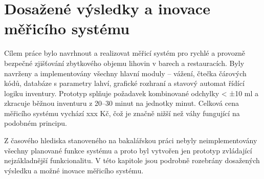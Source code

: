 



%
%

\chapter{Dosažené výsledky a inovace měřicího systému}

 Cílem práce bylo navrhnout a realizovat měřicí systém pro rychlé a provozně bezpečné zjišťování zbytkového objemu lihovin v barech a restauracích. Byly navrženy a implementovány všechny hlavní moduly – vážení, čtečka čárových kódů, databáze s parametry lahví, grafické rozhraní a stavový automat řídící logiku inventury.  Prototyp splňuje požadavek kombinované odchylky < ±10 ml a zkracuje běžnou inventuru z 20–30 minut na jednotky minut. Celková cena měřicího systému vychází xxx Kč, čož je značně nižší než váhy fungující na podobném principu.

Z časového hlediska stanoveného na bakalářskou práci nebyly neimplementovány všechny planované funkce systému a proto byl vytvořen jen prototyp zvládající nejzákladnější funkcionalitu. V této kapitole jsou podrobně rozebrány dosažených výsledku a možné inovace měřicího systému.

%
%
